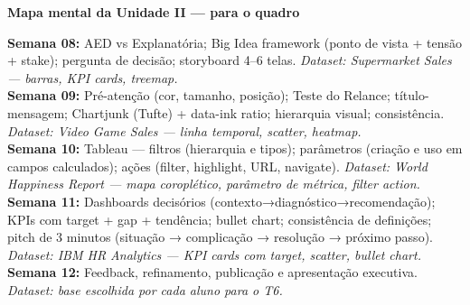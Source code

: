 \begin{SolvedBox}
\textbf{Mapa mental da Unidade II — para o quadro}

\textbf{Semana 08:} AED vs Explanatória; Big Idea framework (ponto de vista + tensão + stake);
pergunta de decisão; storyboard 4–6 telas.
\textit{Dataset: Supermarket Sales — barras, KPI cards, treemap.}\\
\textbf{Semana 09:} Pré-atenção (cor, tamanho, posição); Teste do Relance;
título-mensagem; Chartjunk (Tufte) + data-ink ratio; hierarquia visual; consistência.
\textit{Dataset: Video Game Sales — linha temporal, scatter, heatmap.}\\
\textbf{Semana 10:} Tableau — filtros (hierarquia e tipos); parâmetros (criação e uso
em campos calculados); ações (filter, highlight, URL, navigate).
\textit{Dataset: World Happiness Report — mapa coroplético, parâmetro de métrica, filter action.}\\
\textbf{Semana 11:} Dashboards decisórios (contexto→diagnóstico→recomendação);
KPIs com target + gap + tendência; bullet chart; consistência de definições;
pitch de 3 minutos (situação → complicação → resolução → próximo passo).
\textit{Dataset: IBM HR Analytics — KPI cards com target, scatter, bullet chart.}\\
\textbf{Semana 12:} Feedback, refinamento, publicação e apresentação executiva.
\textit{Dataset: base escolhida por cada aluno para o T6.}
\end{SolvedBox}

